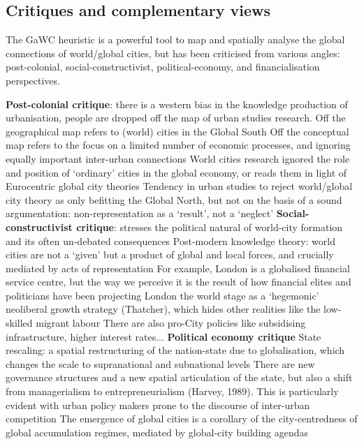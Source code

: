 \documentclass{article}
\begin{document}
\subsection{Critiques and complementary views}

The GaWC heuristic is a powerful tool to map and spatially analyse the global connections of world/global cities, but has been criticised from various angles: post-colonial, social-constructivist, political-economy, and financialisation perspectives.


\begin{outline}
	\1 \textbf{Post-colonial critique}: there is a western bias in the knowledge production of urbanisation, people are dropped off the map of urban studies research. 
		\2 Off the geographical map refers to (world) cities in the Global South
		\2 Off the conceptual map refers to the focus on a limited number of economic processes, and ignoring equally important inter-urban connections
		\2 World cities research ignored the role and position of `ordinary' cities in the global economy,  or reads them in light of Eurocentric global city theories 
		\2 Tendency in urban studies to reject world/global city theory as only befitting the Global North, but not on the basis of a sound argumentation: non-representation as a `result', not a `neglect'
	\1 \textbf{Social-constructivist critique}: stresses the political natural of world-city formation and its often un-debated consequences
		\2 Post-modern knowledge theory: world cities are not a `given' but a product of global and local forces, and crucially mediated by acts of representation
		\2 For example, London is a globalised financial service centre, but the way we perceive it is the result of how financial elites and politicians have been projecting London the world stage as a `hegemonic' neoliberal growth strategy (Thatcher), which hides other realities like the low-skilled migrant labour
		\2 There are also pro-City policies like subsidising infrastructure, higher interest rates...
	\1 \textbf{Political economy critique}
		\2 State rescaling: a spatial restructuring of the nation-state due to globalisation, which changes the scale to supranational and subnational levels
			\3 There are new governance structures and a new spatial articulation of the state, but also a shift from managerialism to entrepreneurialism (Harvey, 1989). This is particularly evident with urban policy makers prone to the discourse of inter-urban competition
			\3 The emergence of global cities is a corollary of the city-centredness of global accumulation regimes, mediated by global-city building agendas

\end{outline}
\end{document}
